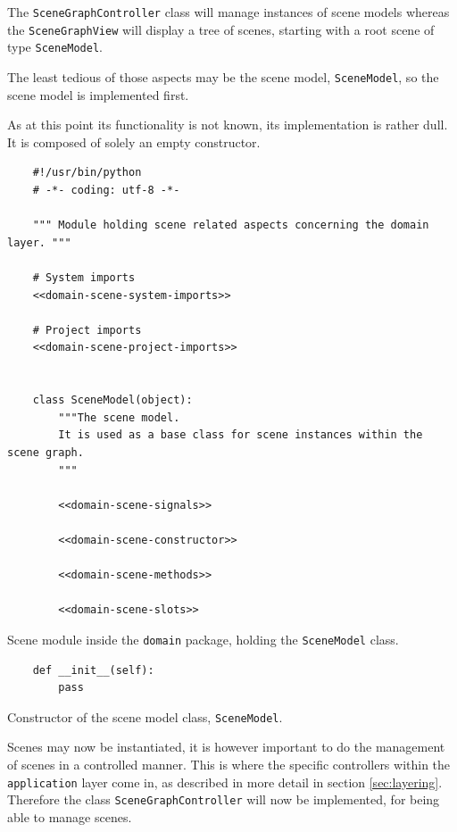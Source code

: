 \documentclass[10pt, openright, notitlepage]{scrreprt}
\begin{document}
The \texttt{SceneGraphController} class will manage instances of scene models
whereas the \texttt{SceneGraphView} will display a tree of scenes, starting
with a root scene of type \texttt{SceneModel}.

The least tedious of those aspects may be the scene model, \texttt{SceneModel}, so
the scene model is implemented first.

As at this point its functionality is not known, its implementation is rather
dull. It is composed of solely an empty constructor.

\begin{listing}[H]
\begin{verbatim}
    #!/usr/bin/python
    # -*- coding: utf-8 -*-
    
    """ Module holding scene related aspects concerning the domain layer. """
    
    # System imports
    <<domain-scene-system-imports>>
    
    # Project imports
    <<domain-scene-project-imports>>
    
    
    class SceneModel(object):
        """The scene model.
        It is used as a base class for scene instances within the scene graph.
        """
    
        <<domain-scene-signals>>
    
        <<domain-scene-constructor>>
    
        <<domain-scene-methods>>
    
        <<domain-scene-slots>>
\end{verbatim}
\caption{Scene module inside the \texttt{domain} package, holding the \texttt{SceneModel} class.}
\end{listing}

\begin{listing}[H]
\begin{verbatim}
    def __init__(self):
        pass
\end{verbatim}
\caption{\label{domain-scene-constructor}
Constructor of the scene model class, \texttt{SceneModel}.}
\end{listing}

Scenes may now be instantiated, it is however important to do the management of
scenes in a controlled manner. This is where the specific controllers within the
\texttt{application} layer come in, as described in more detail in section
\ref{sec:layering}. Therefore the class \texttt{SceneGraphController} will now be
implemented, for being able to manage scenes.
\end{document}
